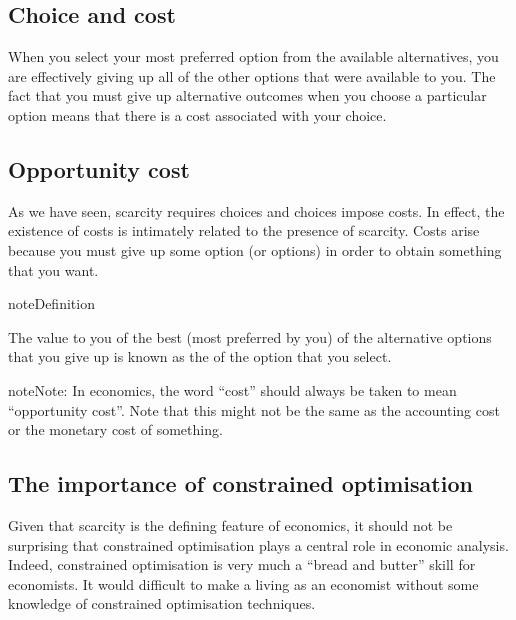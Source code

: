 \documentclass[letterpaper,10pt,english]{jupyterBook}
\begin{document}
\subsection{Choice and cost}
\label{\detokenize{01.intro_to_economics:choice-and-cost}}
\sphinxAtStartPar
When you select your most preferred option from the available alternatives, you are effectively giving up all of the other options that were available to you. The fact that you must give up alternative outcomes when you choose a particular option means that there is a cost associated with your choice.


\subsection{Opportunity cost}
\label{\detokenize{01.intro_to_economics:opportunity-cost}}
\sphinxAtStartPar
As we have seen, scarcity requires choices and choices impose costs. In effect, the existence of costs is intimately related to the presence of scarcity. Costs arise because you must give up some option (or options) in order to obtain something that you want.

\begin{sphinxadmonition}{note}{Definition}

\sphinxAtStartPar
The value to you of the best (most preferred by you) of the alternative options that you give up is known as the  of the option that you select.
\end{sphinxadmonition}

\begin{sphinxadmonition}{note}{Note:}
\sphinxAtStartPar
In economics, the word “cost” should always be taken to mean “opportunity cost”. Note that this might not be the same as the accounting cost or the monetary cost of something.
\end{sphinxadmonition}


\subsection{The importance of constrained optimisation}
\label{\detokenize{01.intro_to_economics:the-importance-of-constrained-optimisation}}
\sphinxAtStartPar
Given that scarcity is the defining feature of economics, it should not be surprising that constrained optimisation plays a central role in economic analysis. Indeed, constrained optimisation is very much a “bread and butter” skill for economists. It would difficult to make a living as an economist without some knowledge of constrained optimisation techniques.
\end{document}
